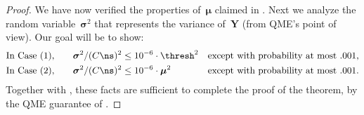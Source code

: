 \documentclass[11pt]{article}
\newcommand{\bY}{\boldsymbol{Y}}
\newcommand{\bmu}{\boldsymbol{\mu}}
\newcommand{\bsigma}{\boldsymbol{\sigma}}
\begin{document}
\begin{proof}
	We have now verified the properties of~$\bmu$ claimed in .  
	Next we analyze the random variable~$\bsigma^2$ that represents the variance of~$\bY$ (from QME's point of view). 
    Our goal will be to show:
    \begin{align}
		\text{In Case (1),\qquad} \bsigma^2/(\cq\ns)^2 & \leq 10^{-6} \cdot \thresh^2 && \text{except with probability at most $.001$,}  \label{eqn:caseee1}\\
		\text{In Case (2),\qquad} \bsigma^2/(\cq\ns)^2 & \leq 10^{-6} \cdot \bmu^2 && \text{except with probability at most $.001$.} \label{eqn:caseee2}
	\end{align}
    Together with , these facts are sufficient to complete the proof of the theorem, by the QME guarantee of .


\end{proof}
\end{document}
